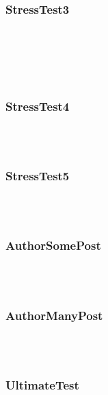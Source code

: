 \begin{description}
\subsubsection{StressTest3}
\\
\\
\\
\\


\subsubsection{StressTest4}
\\
\\


\subsubsection{StressTest5}
\\
\\


\subsubsection{AuthorSomePost}
\\
\\


\subsubsection{AuthorManyPost}
\\
\\


\subsubsection{UltimateTest}
\\
\\
\\

\end{description}


